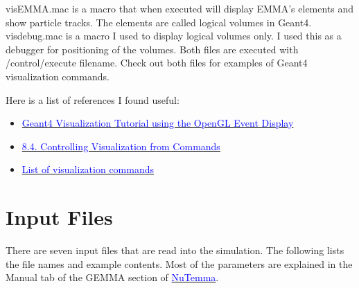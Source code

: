 \documentclass[letter,12pt]{article}
\newcommand{\filefont}[1]{{\fontfamily{pnc}\selectfont #1}\xspace}
\newcommand{\nutemma}{\href{http://davids24.triumf.ca/~oliver/NUTEMMA/home.html}{\textcolor{blue}{NuTemma}}\xspace}
\newcommand{\hrefcolor}[2]{\href{#1}{\textcolor{blue}{#2}}\xspace}
\begin{document}
\filefont{visEMMA.mac} is a macro that when executed will display EMMA's elements and show particle tracks. The elements are called logical volumes in Geant4. \filefont{visdebug.mac} is a macro I used to display logical volumes only. I used this as a debugger for positioning of the volumes. Both files are executed with \filefont{/control/execute filename}. Check out both files for examples of Geant4 visualization commands.

Here is a list of references I found useful:
\begin{itemize}
\item \hrefcolor{http://geant4.slac.stanford.edu/Presentations/vis/G4OpenGLTutorial/G4OpenGLTutorial.html}{Geant4 Visualization Tutorial using the OpenGL Event Display}
\item \hrefcolor{http://geant4.web.cern.ch/geant4/UserDocumentation/UsersGuides/ForApplicationDeveloper/html/ch08s04.html}{8.4.  Controlling Visualization from Commands}
\item \hrefcolor{http://geant4.web.cern.ch/geant4/UserDocumentation/UsersGuides/ForApplicationDeveloper/html/AllResources/Control/UIcommands/_vis_.html}{List of visualization commands}
\end{itemize}

\section{Input Files}\label{sec:input}

There are seven input files that are read into the simulation. The following lists the file names and example contents. Most of the parameters are explained in the Manual tab of the GEMMA section of \nutemma.
\end{document}
